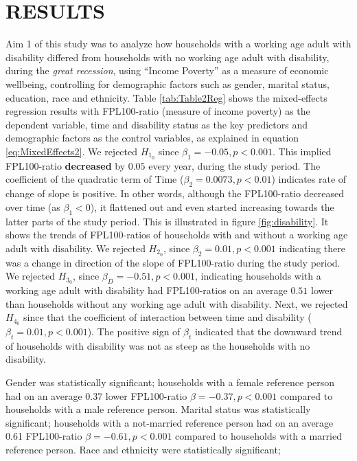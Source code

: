\documentclass[11pt]{extarticle} %
\begin{document}
\section*{RESULTS}
Aim 1 of this study was to analyze how households with a working age adult with disability differed from households with no working age adult with disability, during the {\emph{great recession}}, using ``Income Poverty'' as a measure of economic wellbeing, controlling for demographic factors such as gender, marital status, education, race and ethnicity. Table \ref{tab:Table2Reg} shows the mixed-effects regression results with FPL100-ratio (measure of income poverty) as the dependent variable, time and disability status as the key predictors and demographic factors as the control variables, as explained in equation \ref{eq:MixedEffects2}. We rejected $H_{1_0}$ since $\beta_1 = -0.05, p < 0.001$. This implied FPL100-ratio {\bf{decreased}} by $0.05$ every year, during the study period. The coefficient of the quadratic term of Time ($\beta_2 = 0.0073, p < 0.01$) indicates rate of change of slope is positive. In other words, although the FPL100-ratio decreased over time (as $\beta_1 < 0$), it flattened out and even started increasing towards the latter parts of the study period. This is illustrated in figure \ref{fig:disability}. It shows the trends of FPL100-ratios of households with and without a working age adult with disability. We rejected $H_{2_0}$, since $\beta_2 = 0.01, p < 0.001$ indicating there was a change in direction of the slope of FPL100-ratio during the study period. We rejected $H_{3_0}$, since $\beta_D = -0.51, p < 0.001$, indicating households with a working age adult with disability had FPL100-ratios on an average $0.51$ lower than households without any working age adult with disability. Next, we rejected $H_{4_0}$ since  that the coefficient of interaction between time and disability ($\beta_t = 0.01, p < 0.001$). The positive sign of $\beta_t$ indicated that the downward trend of households with disability was not as steep as the households with no disability. 

Gender was statistically significant; households with a female reference person had on an average 0.37 lower FPL100-ratio $\beta = -0.37, p < 0.001$ compared to households with a male reference person. Marital status was statistically significant; households with a not-married reference person had on an average 0.61 FPL100-ratio $\beta = -0.61, p < 0.001$ compared to households with a married reference person. Race and ethnicity were statistically significant; 
\end{document}
